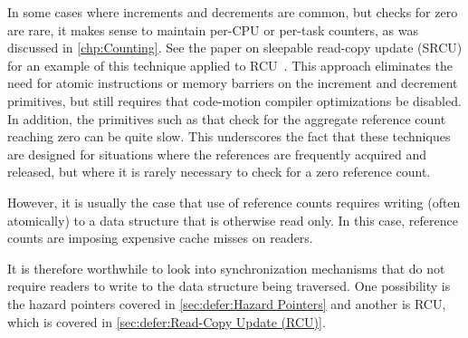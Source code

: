 In some cases where increments and decrements are common, but checks
for zero are rare, it makes sense to maintain per-CPU or per-task
counters, as was discussed in \cref{chp:Counting}.
See the paper on sleepable read-copy update
(SRCU) for an example of this technique applied to
RCU~\cite{PaulEMcKenney2006c}.
This approach eliminates the need for atomic instructions or memory
barriers on the increment and decrement primitives, but still requires
that code-motion compiler optimizations be disabled.
In addition, the primitives such as 
that check for the aggregate reference
count reaching zero can be quite slow.
This underscores the fact that these techniques are designed
for situations where the references are frequently acquired and
released, but where it is rarely necessary to check for a zero
reference count.


However, it is usually the case that use of reference counts requires
writing (often atomically) to a data structure that is otherwise
read only.
In this case, reference counts are imposing expensive cache misses
on readers.

It is therefore worthwhile to look into synchronization mechanisms
that do not require readers to write to the data structure being
traversed.
One possibility is the hazard pointers covered in
\cref{sec:defer:Hazard Pointers}
and another is RCU, which is covered in
\cref{sec:defer:Read-Copy Update (RCU)}.
